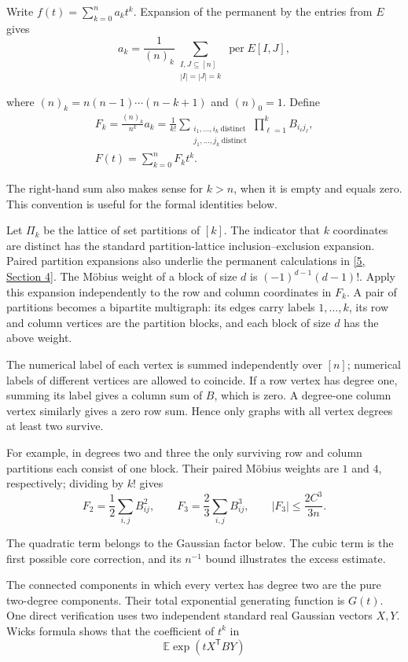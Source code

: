 \documentclass[11pt,a4paper]{article}
\newcommand{\paperref}[2]{\hyperref[#1]{#2}}
\begin{document}
Write \(f(t)=\sum_{k=0}^n a_kt^k\). Expansion of the permanent by the entries from \(E\) gives
\[a_k=\frac1{(n)_k}
\sum_{\substack{I,J\subseteq[n]\\|I|=|J|=k}}
\operatorname{per}E[I,J],\]

where \((n)_k=n(n-1)\cdots(n-k+1)\) and \((n)_0=1\). Define
\[\begin{gathered}
F_k=\frac{(n)_k}{n^k}a_k
=\frac1{k!}
\sum_{\substack{i_1,\ldots,i_k\ \mathrm{distinct}\\
j_1,\ldots,j_k\ \mathrm{distinct}}}
\prod_{\ell=1}^kB_{i_\ell j_\ell},
\\
F(t)=\sum_{k=0}^nF_kt^k.
\end{gathered}\]

The right-hand sum also makes sense for \(k>n\), when it is empty and equals zero. This convention is useful for the formal identities below.

Let \(\Pi_k\) be the lattice of set partitions of \([k]\). The indicator that \(k\) coordinates are distinct has the standard partition-lattice inclusion--exclusion expansion. Paired partition expansions also underlie the permanent calculations in \paperref{bib-5}{[5, Section 4]}. The Möbius weight of a block of size \(d\) is \((-1)^{d-1}(d-1)!\). Apply this expansion independently to the row and column coordinates in \(F_k\). A pair of partitions becomes a bipartite multigraph: its edges carry labels \(1,\ldots,k\), its row and column vertices are the partition blocks, and each block of size \(d\) has the above weight.

The numerical label of each vertex is summed independently over \([n]\); numerical labels of different vertices are allowed to coincide. If a row vertex has degree one, summing its label gives a column sum of \(B\), which is zero. A degree-one column vertex similarly gives a zero row sum. Hence only graphs with all vertex degrees at least two survive.

For example, in degrees two and three the only surviving row and column partitions each consist of one block. Their paired Möbius weights are \(1\) and \(4\), respectively; dividing by \(k!\) gives
\[F_2=\frac12\sum_{i,j}B_{ij}^2,
\qquad
F_3=\frac23\sum_{i,j}B_{ij}^3,
\qquad |F_3|\le\frac{2C^3}{3n}.\]

The quadratic term belongs to the Gaussian factor below. The cubic term is the first possible core correction, and its \(n^{-1}\) bound illustrates the excess estimate.

The connected components in which every vertex has degree two are the pure two-degree components. Their total exponential generating function is \(G(t)\). One direct verification uses two independent standard real Gaussian vectors \(X,Y\). Wick\textquotesingle s formula shows that the coefficient of \(t^k\) in
\[\mathbb E\exp(tX^{\mathsf T}BY)\]
\end{document}
